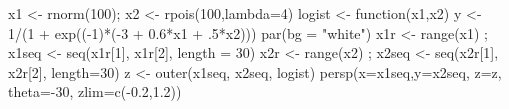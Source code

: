 \begin{Schunk}
\begin{Sinput}
 x1 <- rnorm(100); x2 <- rpois(100,lambda=4) 
 logist <- function(x1,x2){
  y <- 1/(1 + exp((-1)*(-3 + 0.6*x1 + .5*x2))) } 
 par(bg = "white") 
 x1r <- range(x1) ; x1seq <- seq(x1r[1], x1r[2], length = 30)
 x2r <- range(x2) ; x2seq <- seq(x2r[1], x2r[2], length=30)
 z <- outer(x1seq, x2seq, logist)
 persp(x=x1seq,y=x2seq, z=z, theta=-30, zlim=c(-0.2,1.2))
\end{Sinput}
\end{Schunk}
